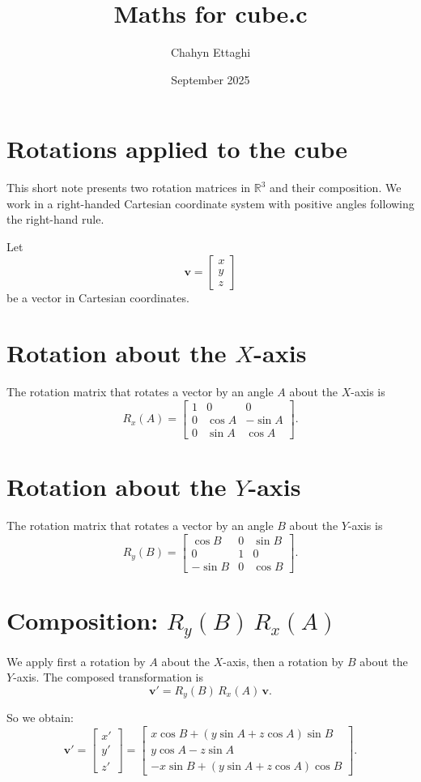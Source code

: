 \documentclass{article}
\title{Maths for cube.c}
\author{Chahyn Ettaghi}
\date{September 2025}
\begin{document}
\maketitle

\section*{Rotations applied to the cube}

This short note presents two rotation matrices in $\mathbb{R}^3$ and their composition. We work in a right-handed Cartesian coordinate system with positive angles following the right-hand rule.

\medskip

Let
\[
\bm{v} = \begin{bmatrix} x \\ y \\ z \end{bmatrix}
\]
be a vector in Cartesian coordinates.

\section*{Rotation about the $X$-axis}

The rotation matrix that rotates a vector by an angle $A$ about the $X$-axis is
\[
R_x(A) = \begin{bmatrix}
1 & 0 & 0 \\
0 & \cos A & -\sin A \\
0 & \sin A & \cos A
\end{bmatrix}.
\]

\section*{Rotation about the $Y$-axis}

The rotation matrix that rotates a vector by an angle $B$ about the $Y$-axis is
\[
R_y(B) = \begin{bmatrix}
\cos B & 0 & \sin B \\
0 & 1 & 0 \\
-\sin B & 0 & \cos B
\end{bmatrix}.
\]

\section*{Composition: $R_y(B)\,R_x(A)$}

We apply first a rotation by $A$ about the $X$-axis, then a rotation by $B$ about the $Y$-axis. The composed transformation is
\[
\bm{v}' = R_y(B)\,R_x(A)\,\bm{v}.
\]

So we obtain:
\[
\bm{v}' = \begin{bmatrix} x' \\ y' \\ z' \end{bmatrix}
= \begin{bmatrix}
x\cos B + (y\sin A + z\cos A)\sin B \\
y\cos A - z\sin A \\
- x\sin B + (y\sin A + z\cos A)\cos B
\end{bmatrix}.
\]
\end{document}
